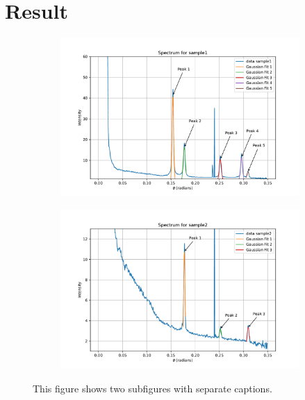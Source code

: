 
\section{Result}


\begin{figure}[H]
    \centering
    \begin{subfigure}[b]{0.99\textwidth} 
        \includegraphics[width=\textwidth]{Figures/gaussian_sample1.pdf}
        \label{fig:subfigure1}
    \end{subfigure}
    \begin{subfigure}[b]{0.99\textwidth} 
        \includegraphics[width=\textwidth]{Figures/gaussian_sample2.pdf}
        \label{fig:subfigure2}
    \end{subfigure}
    \caption{This figure shows two subfigures with separate captions.}
    \label{fig:result_figure}
\end{figure}
